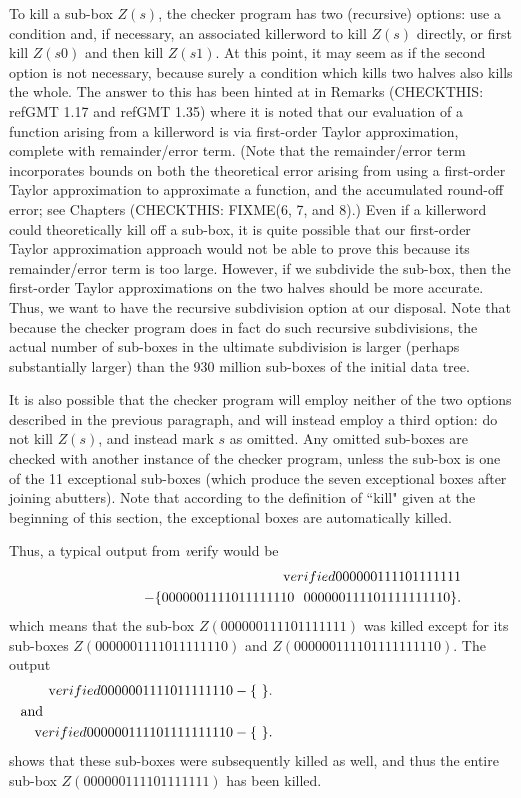 \begin{construction}
To kill a sub-box $Z(s)$, the checker program has two (recursive) options:
use a condition and, if necessary, an associated killerword  to kill $Z(s)$ directly, or first kill $Z(s0)$ and then kill $Z(s1)$.
At this point, it may seem as if the second option is not necessary,
because surely a condition which kills two halves also kills the whole.
The answer to this has been hinted at in 
Remarks (CHECKTHIS: ref{GMT 1.17} and ref{GMT 1.35})
 where
it is noted that our evaluation of a function arising
from a killerword  is via first-order Taylor
approximation, complete with remainder/error term.
(Note that the remainder/error term incorporates bounds on
both the theoretical error arising from using a first-order Taylor
approximation to approximate a function, and the accumulated
round-off error; see 
Chapters (CHECKTHIS: FIXME(6, 7,  and 8).)
Even if a killerword could theoretically kill off a sub-box,
it is quite possible that our
first-order Taylor approximation approach would not be
able to prove this 
because its remainder/error term is too large.
However, if we subdivide the sub-box, then the first-order
Taylor approximations on the two halves should be more accurate.  
Thus,
we want to have the recursive subdivision option at our
disposal.
Note that because the checker program does in fact do such 
recursive subdivisions, the actual number of sub-boxes in the
ultimate subdivision is larger (perhaps substantially larger)
than the 930 million sub-boxes of the initial data tree.

It is also possible that the checker program will employ
neither of the two options described in the previous
paragraph, and will instead employ  
a third option: do not kill $Z(s)$, and instead
mark $s$ as omitted.
Any omitted sub-boxes are checked with another instance
of the checker program,
unless the sub-box is one of the 11 exceptional
sub-boxes (which produce the seven exceptional boxes after joining abutters).
Note that according to the definition of ``kill" given at the beginning of this section, the exceptional boxes are
automatically killed.   

Thus, a typical output from {\textit verify} would be 
\begin{eqnarray*}
&&{\textrm verified} 000000111101111111 \\
&&\qquad\qquad\quad- 
\{ 0000001111011111110 \ \ 000000111101111111110 \} .
\end{eqnarray*}
which means that the sub-box $Z(000000111101111111)$ was killed except for its sub-boxes
$Z(0000001111011111110)$  and $Z(000000111101111111110).$  The output 
\begin{eqnarray*}
&&{\textrm verified} 0000001111011111110 - \{\ \}.\\
\noalign{\noindent and}
&&{\textrm verified} 000000111101111111110 - \{\ \}.
\end{eqnarray*} shows that these sub-boxes were subsequently killed as well, and thus the entire sub-box
$Z(000000111101111111)$ has been killed. 



\end{construction}
